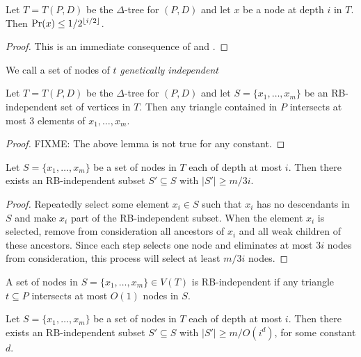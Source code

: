 \documentclass[lotsofwhite]{patmorin}
\begin{document}
\begin{lem}
Let $T=T(P,D)$ be the $\Delta$-tree for $(P,D)$ and
let $x$ be a node at depth $i$ in $T$.  Then $\Pr(x)\le 1/2^{\left\lfloor i/2 \right\rfloor}$.
\end{lem}

\begin{proof}
This is an immediate consequence of  and
.
\end{proof}

We call a set of nodes of $t$ \emph{genetically independent}

\begin{lem}
Let $T=T(P,D)$ be the $\Delta$-tree for $(P,D)$ and
let $S=\{x_1,\ldots,x_m\}$ be an RB-independent set of vertices in $T$.
Then any triangle contained in $P$ intersects at most 3 elements of
$x_1,\ldots,x_m$.
\end{lem}

\begin{proof}
FIXME: The above lemma is not true for any constant.
\end{proof}

\begin{lem}
Let $S=\{x_1,\ldots,x_m\}$ be a set of nodes in $T$ each of depth at
most $i$.  Then there exists an RB-independent subset $S'\subseteq S$
with $|S'|\ge m/3i$.
\end{lem}

\begin{proof}
Repeatedly select some element $x_i\in S$ such that $x_i$ has no
descendants in $S$ and make $x_i$ part of the RB-independent subset.
When the element $x_i$ is selected, remove from consideration all
ancestors of $x_i$ and all weak children of these ancestors.  Since
each step selects one node and eliminates at most $3i$ nodes from
consideration, this process will select at least $m/3i$ nodes.
\end{proof}


A set of nodes in $S=\{x_1,\ldots,x_m\}\in V(T)$ is RB-independent if
any triangle $t\subseteq P$ intersects at most $O(1)$ nodes in $S$.

\begin{lem}
Let $S=\{x_1,\ldots,x_m\}$ be a set of nodes in $T$ each of depth at
most $i$.  Then there exists an RB-independent subset $S'\subseteq S$
with $|S'|\ge m/O(i^d)$, for some constant $d$.
\end{lem}
\end{document}
